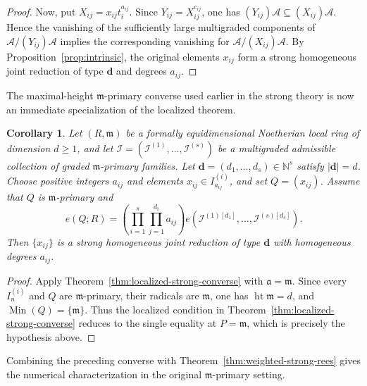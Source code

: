 \documentclass[reqno,12pt]{amsart}
\theoremstyle{plain}
\newtheorem{cor}[prop]{Corollary}
\theoremstyle{definition}
\theoremstyle{remark}
\numberwithin{equation}{section}
\begin{document}
\begin{proof}
Now, put $X_{ij}=x_{ij}t_i^{a_{ij}}$. Since
$Y_{ij}=X_{ij}^{c_{ij}}$, one has
$(Y_{ij})\mathcal A\subseteq(X_{ij})\mathcal A$. Hence the vanishing of
the sufficiently large multigraded components of
$\mathcal A/(Y_{ij})\mathcal A$ implies the corresponding vanishing for
$\mathcal A/(X_{ij})\mathcal A$. By
Proposition~\ref{prop:intrinsic}, the original elements $x_{ij}$ form a
strong homogeneous joint reduction of type $\mathbf d$ and degrees
$a_{ij}$.
\end{proof}

The maximal-height $\mathfrak m$-primary converse used earlier in the
strong theory is now an immediate specialization of the localized
theorem.

\begin{cor}
\label{cor:strong-converse}
\label{thm:strong-converse}
Let $(R,\mathfrak m)$ be a formally equidimensional Noetherian local ring
of dimension $d\geq1$, and let
$\boldsymbol{\mathcal I}
=(\mathcal I^{(1)},\ldots,\mathcal I^{(s)})$
be a multigraded admissible collection of graded
$\mathfrak m$-primary families. Let
$\mathbf d=(d_1,\ldots,d_s)\in\mathbb N^s$ satisfy $|\mathbf d|=d$.
Choose positive integers $a_{ij}$ and elements
$x_{ij}\in I_{a_{ij}}^{(i)}$, and set $Q=(x_{ij})$. Assume that $Q$ is
$\mathfrak m$-primary and
\[
e(Q;R)
=
\left(\prod_{i=1}^{s}\prod_{j=1}^{d_i}a_{ij}\right)
e\!\left(
\mathcal I^{(1)[d_1]},\ldots,
\mathcal I^{(s)[d_s]}
\right).
\]
Then $\{x_{ij}\}$ is a strong homogeneous joint reduction of type
$\mathbf d$ with homogeneous degrees $a_{ij}$.
\end{cor}

\begin{proof}
Apply Theorem~\ref{thm:localized-strong-converse} with
$\mathfrak a=\mathfrak m$. Since every $I_n^{(i)}$ and $Q$ are
$\mathfrak m$-primary, their radicals are $\mathfrak m$, one has
$\operatorname{ht}\mathfrak m=d$, and
$\operatorname{Min}(Q)=\{\mathfrak m\}$. Thus the localized condition in
Theorem~\ref{thm:localized-strong-converse} reduces to the single
equality at $P=\mathfrak m$, which is precisely the hypothesis above.
\end{proof}

Combining the preceding converse with
Theorem~\ref{thm:weighted-strong-rees} gives the numerical
characterization in the original $\mathfrak m$-primary setting.
\end{document}
